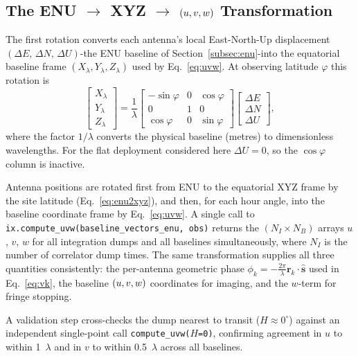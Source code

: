 \subsection{The ENU \texorpdfstring{$\rightarrow$}{->} XYZ \texorpdfstring{$\rightarrow$}{->} \texorpdfstring{$(u,v,w)$}{(u,v,w)} Transformation}
\label{subsec:enu2xyz}

The first rotation converts each antenna's local East-North-Up displacement
$(\Delta E,\,\Delta N,\,\Delta U)$-the ENU baseline of
Section~\ref{subsec:enu}-into the equatorial baseline frame
$(X_\lambda,Y_\lambda,Z_\lambda)$ used by Eq.~\eqref{eq:uvw}.
At observing latitude $\varphi$ this rotation is \citep{tms2017}
\begin{equation}
  \begin{bmatrix} X_\lambda \\ Y_\lambda \\ Z_\lambda \end{bmatrix}
  = \frac{1}{\lambda}
  \begin{bmatrix}
    -\sin\varphi & 0 & \cos\varphi \\
     0           & 1 & 0           \\
     \cos\varphi & 0 & \sin\varphi
  \end{bmatrix}
  \begin{bmatrix} \Delta E \\ \Delta N \\ \Delta U \end{bmatrix},
  \label{eq:enu2xyz}
\end{equation}
where the factor $1/\lambda$ converts the physical baseline (metres) to
dimensionless wavelengths. For the flat deployment considered here
$\Delta U = 0$, so the $\cos\varphi$ column is inactive.

Antenna positions are rotated first from ENU to the equatorial XYZ frame by
the site latitude (Eq.~\eqref{eq:enu2xyz}), and then, for each hour angle, into
the baseline coordinate frame by Eq.~\eqref{eq:uvw}. A single call to
\texttt{ix.compute\_uvw(baseline\_vectors\_enu, obs)} returns the
$(N_I\times N_B)$ arrays $u$, $v$, $w$ for all integration dumps and all baselines
simultaneously, where $N_I$ is the number of correlator dump times. The same
transformation supplies all three quantities consistently: the per-antenna
geometric phase $\phi_k = -\frac{2\pi}{\lambda}\bm{r}_k\cdot\hat{\bm{s}}$
used in Eq.~\eqref{eq:vk}, the baseline $(u,v,w)$ coordinates for imaging, and
the $w$-term for fringe stopping.

A validation step cross-checks the dump nearest to transit
($H \approx 0^\circ$) against an independent single-point call
\texttt{compute\_uvw($H$=0)}, confirming agreement in $u$ to within 1~$\lambda$
and in $v$ to within 0.5~$\lambda$ across all baselines.

